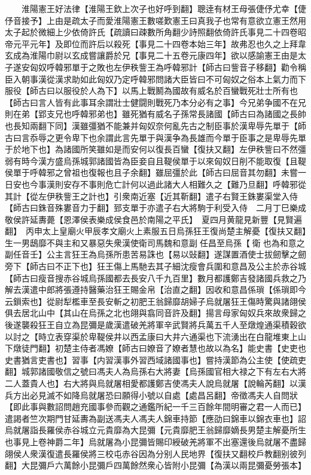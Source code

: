 　　淮陽憲王好法律【淮陽王欽上次子也好呼到翻】聰逹有材王母張倢伃尤幸【倢伃音接予】上由是疏太子而愛淮陽憲王數嗟歎憲王曰真我子也常有意欲立憲王然用太子起於微細上少依倚許氏【疏讀曰疎數所角翻少詩照翻依倚許氏事見二十四卷昭帝元平元年】及即位而許后以殺死【事見二十四卷本始三年】故弗忍也久之上拜韋玄成為淮陽巾尉以玄成嘗讓爵於兄【事見二十五卷元康四年】欲以感諭憲王由是太子遂安匈奴呼韓邪單于之敗也左伊秩訾王為呼韓邪計【師古曰訾音子移翻】勸令稱臣入朝事漢從漢求助如此匈奴乃定呼韓邪問諸大臣皆曰不可匈奴之俗本上氣力而下服役【師古曰以服役於人為下】以馬上戰鬭為國故有威名於百蠻戰死壯士所有也【師古曰言人皆有此事耳余謂壯士健闘則戰死乃本分必有之事】今兄弟争國不在兄則在弟【郢支兄也呼韓邪弟也】雖死猶有威名子孫常長諸國【師古曰為諸國之長帥也長知兩翻下同】漢雖彊猶不能兼并匈奴奈何亂先古之制臣事於漢卑辱先單于【師古曰言忝辱之更令卑下也余謂此言先單于與漢争為長雄而今單于臣事之是卑辱先單于於地下也】為諸國所笑雖如是而安何以復長百蠻【復扶又翻】左伊秩訾曰不然彊弱有時今漢方盛烏孫城郭諸國皆為臣妾自且鞮侯單于以來匈奴日削不能取復【且鞮侯單于呼韓邪之曾祖也復報也且子余翻】雖屈彊於此【師古曰屈音其勿翻】未嘗一日安也今事漢則安存不事則危亡計何以過此諸大人相難久之【難乃旦翻】呼韓邪從其計【從左伊秩訾王之計也】引衆南近塞【近其靳翻】遣子右賢王銖婁渠堂入侍【師古曰銖音殊婁音力于翻】郅支單于亦遣子右大將駒于利受入侍　二月丁巳樂成敬侯許延夀薨【恩澤侯表樂成侯食邑於南陽之平氏】　夏四月黄龍見新豐【見賢遍翻】　丙申太上皇廟火甲辰孝文廟火上素服五日烏孫狂王復尚楚主解憂【復扶又翻】生一男鴟靡不與主和又暴惡失衆漢使衛司馬魏和意副任昌至烏孫【衛也為和意之副任音壬】公主言狂王為烏孫所患苦易誅也【易以䜴翻】遂謀置酒使士拔劒擊之劒旁下【師古曰不正下也】狂王傷上馬馳去其子細沈瘦會兵圍和意昌及公主於赤谷城【師古曰瘦音搜赤谷城烏孫國都去長安八千九百里】數月都護鄭吉發諸國兵救之乃解去漢遣中郎將張遵持醫藥治狂王賜金帛【治直之翻】因收和意昌係瑣【係瑣即今云鎻索也】從尉犁檻車至長安斬之初肥王翁歸靡胡婦子烏就屠狂王傷時驚與諸翖侯俱去居北山中【其山在烏孫之北也翖與翕同音許及翻】揚言母家匈奴兵來故衆歸之後遂襲殺狂王自立為昆彌是歲漢遣破羌將軍辛武賢將兵萬五千人至燉煌通渠積穀欲以討之【時立表穿渠於卑鞮侯井以西孟康曰大井六通渠也下流湧出在白龍堆東上山下燉徒門翻】初楚主侍者馮嫽【師古曰嫽音了嫽者慧也故以為名】能史書【史吏也史書猶言吏書也】習事【内習漢事外習西域諸國事也】嘗持漢節為公主使【使疏吏翻】城郭諸國敬信之號曰馮夫人為烏孫右大將妻【烏孫國官相大禄之下有左右大將二人蓋貴人也】右大將與烏就屠相愛都護鄭吉使馮夫人說烏就屠【說輪芮翻】以漢兵方出必見滅不如降烏就屠恐曰願得小號以自處【處昌呂翻】帝徵馮夫人自問狀【即此事與數詔問趙充國事參而觀之通鑑所紀一千三百餘年間明審之君一人而已】遣謁者竺次期門甘延夀為副送馮夫人馮夫人錦車持節【應劭曰錦車以錦衣車也】詔烏就屠詣長羅侯赤谷城立元貴靡為大昆彌【元貴靡肥王翁歸靡嫡長男楚主解憂所生也事見上卷神爵二年】烏就屠為小昆彌皆賜印綬破羌將軍不出塞還後烏就屠不盡歸翖侯人衆漢復遣長羅侯將三校屯赤谷因為分别人民地界【復扶又翻校戶教翻别彼列翻】大昆彌戶六萬餘小昆彌戶四萬餘然衆心皆附小昆彌【為漢以兩昆彌憂勞張本】

